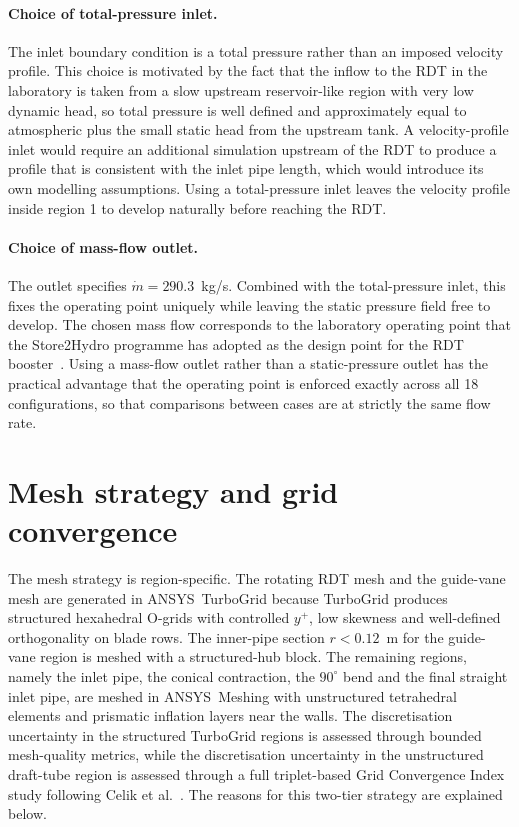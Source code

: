 \paragraph{Choice of total-pressure inlet.}
The inlet boundary condition is a total pressure rather than an imposed velocity profile. This choice is motivated by the fact that the inflow to the RDT in the laboratory is taken from a slow upstream reservoir-like region with very low dynamic head, so total pressure is well defined and approximately equal to atmospheric plus the small static head from the upstream tank. A velocity-profile inlet would require an additional simulation upstream of the RDT to produce a profile that is consistent with the inlet pipe length, which would introduce its own modelling assumptions. Using a total-pressure inlet leaves the velocity profile inside region 1 to develop naturally before reaching the RDT.
 
\paragraph{Choice of mass-flow outlet.}
The outlet specifies $\dot m = 290.3$~kg/s. Combined with the total-pressure inlet, this fixes the operating point uniquely while leaving the static pressure field free to develop. The chosen mass flow corresponds to the laboratory operating point that the Store2Hydro programme has adopted as the design point for the RDT booster~\cite{DjupeslandTrivedi2025, Fjuk2025}. Using a mass-flow outlet rather than a static-pressure outlet has the practical advantage that the operating point is enforced exactly across all 18 configurations, so that comparisons between cases are at strictly the same flow rate.
 
\section{Mesh strategy and grid convergence}
\label{sec:methods_mesh}

The mesh strategy is region-specific. The rotating RDT mesh and the guide-vane mesh are generated in ANSYS~TurboGrid because TurboGrid produces structured hexahedral O-grids with controlled $y^+$, low skewness and well-defined orthogonality on blade rows. The inner-pipe section $r < 0.12$~m for the guide-vane region is meshed with a structured-hub block. The remaining regions, namely the inlet pipe, the conical contraction, the $90^\circ$ bend and the final straight inlet pipe, are meshed in ANSYS~Meshing with unstructured tetrahedral elements and prismatic inflation layers near the walls. The discretisation uncertainty in the structured TurboGrid regions is assessed through bounded mesh-quality metrics, while the discretisation uncertainty in the unstructured draft-tube region is assessed through a full triplet-based Grid Convergence Index study following Celik et al.~\cite{Celik2008}. The reasons for this two-tier strategy are explained below.

